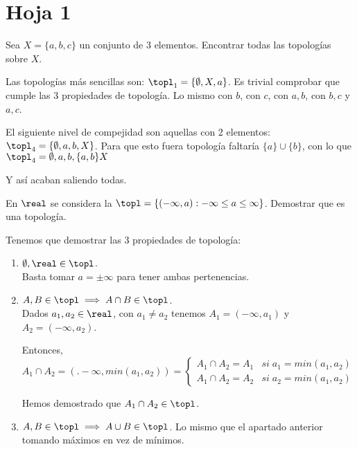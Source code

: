 \section{Hoja 1}

\begin{problem}[1]
Sea $X=\{a,b,c\}$ un conjunto de 3 elementos. Encontrar todas las topologías sobre $X$.
\solution

Las topologías más sencillas son: $\topl_1 = \{\emptyset,X,a\}$. Es trivial comprobar que cumple las 3 propiedades de topología. Lo mismo con $b$, con $c$, con ${a,b}$, con ${b,c}$ y ${a,c}$.

El siguiente nivel de compejidad son aquellas con 2 elementos: $\topl_4 = \{\emptyset,a,b,X\}$. Para que esto fuera topología faltaría $\{a\} \cup \{b\}$, con lo que $\topl_4 = {\emptyset,a,b,\{a,b\}X}$

Y así acaban saliendo todas.
\end{problem}

\begin{problem}[2]
En $\real$ se considera la $\topl =\{(-\infty,a): -\infty \leq a \leq \infty\}$. Demostrar que es una topología.
\solution

Tenemos que demostrar las 3 propiedades de topología:

\begin{enumerate}
\item $\emptyset,\real \in \topl$. \\Basta tomar $a=\pm \infty$ para tener ambas pertenencias.
\item $A,B\in\topl \implies A\cap B\in\topl$.\\ Dados $a_1,a_2\in\real$, con $a_1\neq a_2$ tenemos $A_1 = (-\infty,a_1)$ y $A_2 = (-\infty,a_2)$.

Entonces, $A_1\cap A_2 = (.-\infty,min(a_1,a_2)) = \left\{\begin{array}{cc}
A_1\cap A_2 = A_1 & si\; a_1 = min(a_1,a_2)\\A_1\cap A_2 = A_2  & si\; a_2 = min(a_1,a_2)
\end{array}\right.$

Hemos demostrado que $A_1 \cap A_2 \in \topl$.

\item $A,B\in\topl \implies A\cup B\in\topl$. Lo mismo que el apartado anterior tomando máximos en vez de mínimos.
\end{enumerate}
\end{problem}


